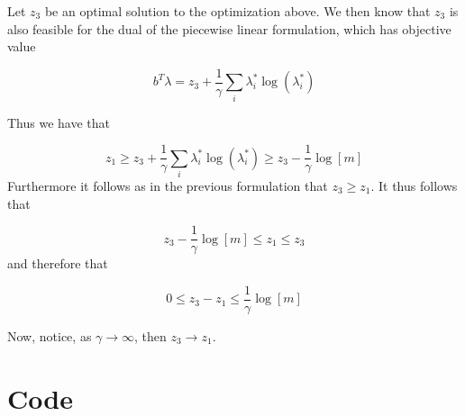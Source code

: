 \documentclass[answers]{exam} %
\begin{document}
\begin{itemize}
\begin{framed}
Let $z_3$ be an optimal solution to the optimization above. We then know that $z_3$ is also feasible for the dual of the piecewise
linear formulation, which has objective value 

\[
b^T \lambda = z_3 +   \frac{1}{\gamma} \sum_{i} \lambda_i^{*} \log(\lambda_i^*)
\]

Thus we have that

\[
z_1 \geq  z_3 +   \frac{1}{\gamma} \sum_{i}\lambda_i^{*} \log(\lambda_i^*) \geq z_3 -  \frac{1}{\gamma} \log[m]
\]
Furthermore it follows as in the previous formulation that $z_3 \geq z_1$.
It thus follows that 

\[
z_3 - \frac{1}{\gamma} \log[m] \leq z_1 \leq z_3 
\]
and therefore that

\[
0 \leq z_3 - z_1 \leq \frac{1}{\gamma} \log[m]
\]


Now, notice, as  $\gamma \to \infty$, then $z_3 \to z_1$. 

\end{framed}
\end{itemize}

\section*{Code}

         
      
 
        
  

     
     
        
 
        
   

\end{document}
